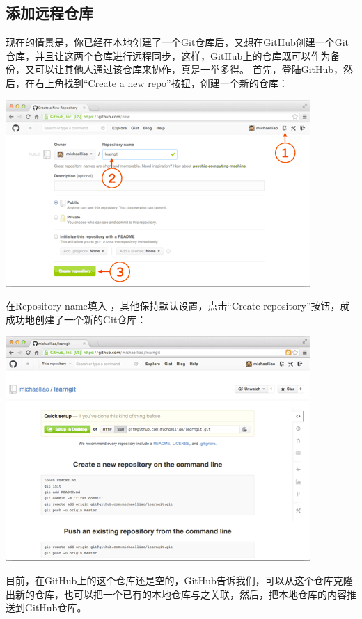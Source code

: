 \documentclass[•]{article}
\begin{document}
\begin{CJK}{UTF8}{gbsn}
\subsection{添加远程仓库}
\qquad 现在的情景是，你已经在本地创建了一个Git仓库后，又想在GitHub创建一个Git仓库，并且让这两个仓库进行远程同步，这样，GitHub上的仓库既可以作为备份，又可以让其他人通过该仓库来协作，真是一举多得。
首先，登陆GitHub，然后，在右上角找到“Create a new repo”按钮，创建一个新的仓库：
\begin{center}
\includegraphics[scale=0.6]{4.png}
\end{center}
\qquad 在Repository name填入\fbox{\color{red}{learngit}} ，其他保持默认设置，点击“Create repository”按钮，就成功地创建了一个新的Git仓库：
\begin{center}
\includegraphics[scale=0.6]{5.png}
\end{center}
\qquad 目前，在GitHub上的这个\fbox{\color{red}{learngit}}仓库还是空的，GitHub告诉我们，可以从这个仓库克隆出新的仓库，也可以把一个已有的本地仓库与之关联，然后，把本地仓库的内容推送到GitHub仓库。


\end{CJK}
\end{document}
